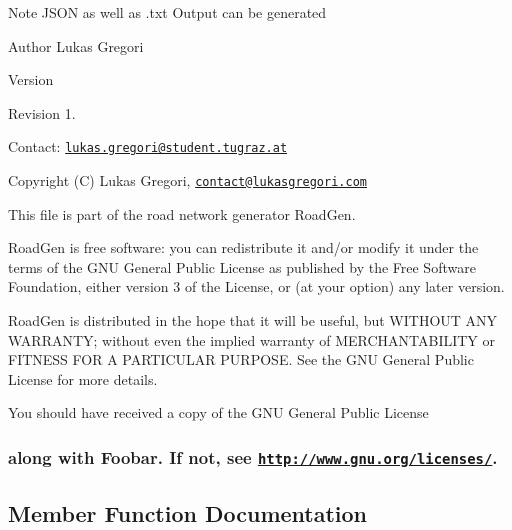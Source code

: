 \begin{DoxyNote}{Note}
J\+S\+ON as well as .txt Output can be generated
\end{DoxyNote}
\begin{DoxyAuthor}{Author}
Lukas Gregori 
\end{DoxyAuthor}
\begin{DoxyVersion}{Version}

\end{DoxyVersion}
\begin{DoxyParagraph}{Revision}
1. 
\end{DoxyParagraph}


Contact\+: \href{mailto:lukas.gregori@student.tugraz.at}{\tt lukas.\+gregori@student.\+tugraz.\+at}



 Copyright (C) Lukas Gregori, \href{mailto:contact@lukasgregori.com}{\tt contact@lukasgregori.\+com}

This file is part of the road network generator Road\+Gen.

Road\+Gen is free software\+: you can redistribute it and/or modify it under the terms of the G\+NU General Public License as published by the Free Software Foundation, either version 3 of the License, or (at your option) any later version.

Road\+Gen is distributed in the hope that it will be useful, but W\+I\+T\+H\+O\+UT A\+NY W\+A\+R\+R\+A\+N\+TY; without even the implied warranty of M\+E\+R\+C\+H\+A\+N\+T\+A\+B\+I\+L\+I\+TY or F\+I\+T\+N\+E\+SS F\+OR A P\+A\+R\+T\+I\+C\+U\+L\+AR P\+U\+R\+P\+O\+SE. See the G\+NU General Public License for more details.

You should have received a copy of the G\+NU General Public License \subsubsection*{along with Foobar. If not, see \href{http://www.gnu.org/licenses/}{\tt http\+://www.\+gnu.\+org/licenses/}. }

\subsection{Member Function Documentation}
\hypertarget{class_j_s_o_n_generator_a74a484947b0a0fd18b5d89b09709850e}{}\label{class_j_s_o_n_generator_a74a484947b0a0fd18b5d89b09709850e} 
